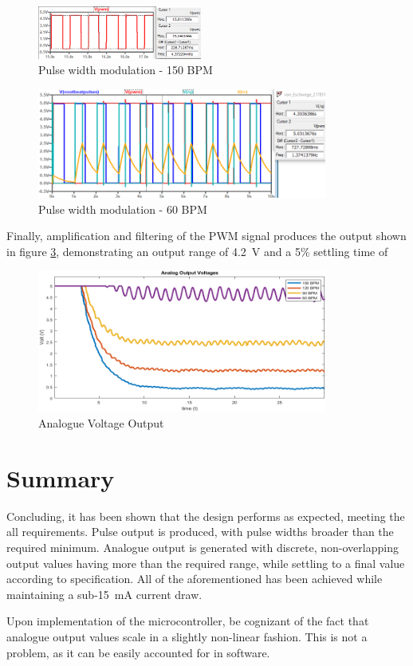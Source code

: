 \begin{figure}
    \centering
    \includegraphics[width = 0.48\textwidth]{./Figures/curses}
    \caption{Pulse width modulation - 150 BPM}
    \label{fig:curses}
\end{figure}

\begin{figure}
\centering
\includegraphics[width=0.85\textwidth]{./Figures/pwm}
\caption{Pulse width modulation - 60 BPM}
\label{fig:pwm}
\end{figure}

Finally, amplification and filtering of the PWM signal produces the output shown in figure \ref{fig:analog}, demonstrating an output range of \SI{4.2}{V} and a 5\% settling time of 

\begin{figure}
\centering
\includegraphics[width=0.85\textwidth]{./Figures/analog}
\caption{Analogue Voltage Output}
\label{fig:analog}
\end{figure}



\section{Summary}\label{sec:temp_summary}
Concluding, it has been shown that the design performs as expected, meeting the all requirements. Pulse output is produced, with pulse widths broader than the required minimum. Analogue output is generated with discrete, non-overlapping output values having more than the required range, while settling to a final value according to specification.  All of the aforementioned has been achieved while maintaining a sub-\SI{15}{mA} current draw. 

Upon implementation of the microcontroller, be cognizant of the fact that analogue output values scale in a slightly non-linear fashion. This is not a problem, as it can be easily accounted for in software.

